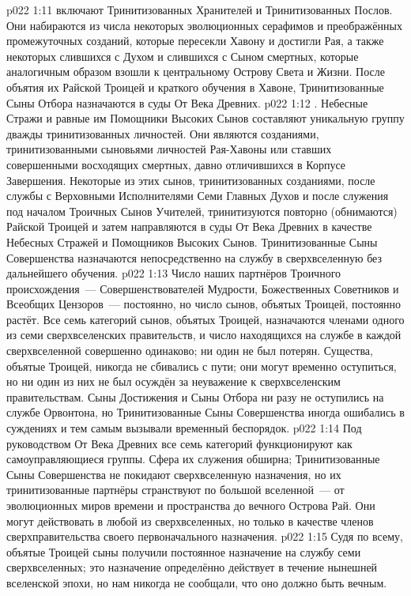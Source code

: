 \vs p022 1:11 \pc {} включают Тринитизованных Хранителей и Тринитизованных Послов. Они набираются из числа некоторых эволюционных серафимов и преображённых промежуточных созданий, которые пересекли Хавону и достигли Рая, а также некоторых слившихся с Духом и слившихся с Сыном смертных, которые аналогичным образом взошли к центральному Острову Света и Жизни. После объятия их Райской Троицей и краткого обучения в Хавоне, Тринитизованные Сыны Отбора назначаются в суды От Века Древних.
\vs p022 1:12 \pc {}. Небесные Стражи и равные им Помощники Высоких Сынов составляют уникальную группу дважды тринитизованных личностей. Они являются созданиями, тринитизованными сыновьями личностей Рая\hyp{}Хавоны или ставших совершенными восходящих смертных, давно отличившихся в Корпусе Завершения. Некоторые из этих сынов, тринитизованных созданиями, после службы с Верховными Исполнителями Семи Главных Духов и после служения под началом Троичных Сынов Учителей, тринитизуются повторно (обнимаются) Райской Троицей и затем направляются в суды От Века Древних в качестве Небесных Стражей и Помощников Высоких Сынов. Тринитизованные Сыны Совершенства назначаются непосредственно на службу в сверхвселенную без дальнейшего обучения.
\vs p022 1:13 \pc Число наших партнёров Троичного происхождения~--- Совершенствователей Мудрости, Божественных Советников и Всеобщих Цензоров~--- постоянно, но число сынов, объятых Троицей, постоянно растёт. Все семь категорий сынов, объятых Троицей, назначаются членами одного из семи сверхвселенских правительств, и число находящихся на службе в каждой сверхвселенной совершенно одинаково; ни один не был потерян. Существа, объятые Троицей, никогда не сбивались с пути; они могут временно оступиться, но ни один из них не был осуждён за неуважение к сверхвселенским правительствам. Сыны Достижения и Сыны Отбора ни разу не оступились на службе Орвонтона, но Тринитизованные Сыны Совершенства иногда ошибались в суждениях и тем самым вызывали временный беспорядок.
\vs p022 1:14 Под руководством От Века Древних все семь категорий функционируют как самоуправляющиеся группы. Сфера их служения обширна; Тринитизованные Сыны Совершенства не покидают сверхвселенную назначения, но их тринитизованные партнёры странствуют по большой вселенной~--- от эволюционных миров времени и пространства до вечного Острова Рай. Они могут действовать в любой из сверхвселенных, но только в качестве членов сверхправительства своего первоначального назначения.
\vs p022 1:15 Судя по всему, объятые Троицей сыны получили постоянное назначение на службу семи сверхвселенных; это назначение определённо действует в течение нынешней вселенской эпохи, но нам никогда не сообщали, что оно должно быть вечным.

